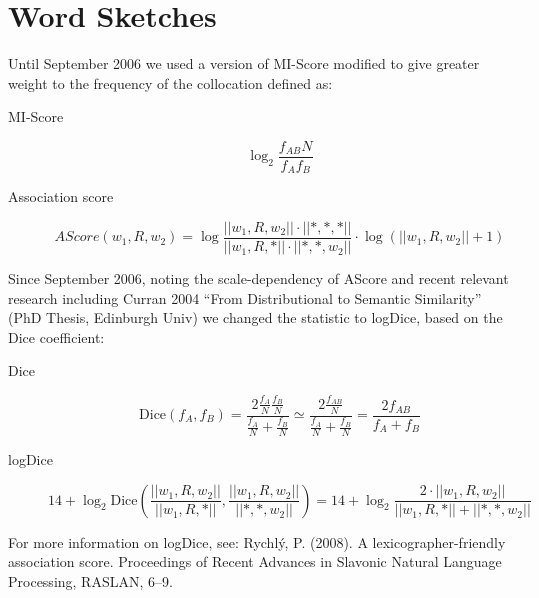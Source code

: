 \documentclass{article}
\begin{document}
\newpage
\section{Word Sketches}

Until September 2006 we used a version of MI-Score modified to give greater weight to the frequency of the collocation  defined as:

\begin{description}

\item[MI-Score] $$\log_2 \frac{f_{AB}  N}{f_A  f_B}$$
\item[Association score]  $$AScore(w_1, R, w_2) =  \log \frac{||w_1,R,w_2|| \cdot
  ||*,*,*||}{||w_1,R,*|| \cdot ||*,*,w_2||} \cdot  \log ( ||w_1,R,w_2|| + 1 )$$
\end{description}

Since September 2006, noting the scale-dependency of AScore and recent relevant research including Curran 2004 ``From Distributional to Semantic Similarity'' (PhD Thesis, Edinburgh Univ) we changed the statistic to logDice, based on the Dice coefficient:
\begin{description}

\item[Dice]

		$$ \text{Dice}(f_A, f_B) = \frac{2 \frac{f_A}{N} \frac{f_B}{N}}{\frac{f_A}{N} + \frac{f_B}{N}} \simeq \frac{2 \frac{f_{AB}}{N}}{\frac{f_A}{N} + \frac{f_B}{N}} =  \frac{2 f_{AB}}{f_A + f_B} $$

\item[logDice]
$$ 14 + \log_2 \text{Dice}\left(\frac{||w_1,R,w_2||}{||w_1,R,*||}, \frac{||w_1,R,w_2||}{||*,*,w_2||}\right) = 14 + \log_2 \frac{2 \cdot ||w_1,R,w_2||}{||w_1,R,*|| + ||*,*,w_2||} $$
\end{description}

For more information on logDice, see: Rychlý, P. (2008). A lexicographer-friendly association score. Proceedings of Recent Advances in Slavonic Natural Language Processing, RASLAN, 6--9.
\end{document}
